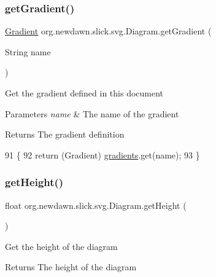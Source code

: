 \subsubsection{\texorpdfstring{get\+Gradient()}{getGradient()}}
{\footnotesize\ttfamily \mbox{\hyperlink{classorg_1_1newdawn_1_1slick_1_1svg_1_1_gradient}{Gradient}} org.\+newdawn.\+slick.\+svg.\+Diagram.\+get\+Gradient (\begin{DoxyParamCaption}\item[{String}]{name }\end{DoxyParamCaption})\hspace{0.3cm}{\ttfamily [inline]}}

Get the gradient defined in this document


\begin{DoxyParams}{Parameters}
{\em name} & The name of the gradient \\
\hline
\end{DoxyParams}
\begin{DoxyReturn}{Returns}
The gradient definition 
\end{DoxyReturn}

\begin{DoxyCode}
91                                              \{
92         \textcolor{keywordflow}{return} (Gradient) \mbox{\hyperlink{classorg_1_1newdawn_1_1slick_1_1svg_1_1_diagram_acdc6103a0bc213559f53001de2c06548}{gradients}}.get(name);
93     \}
\end{DoxyCode}
\mbox{\label{classorg_1_1newdawn_1_1slick_1_1svg_1_1_diagram_ac5e6c5d35ccfdb09d256ae3118210eb8}} 
\subsubsection{\texorpdfstring{get\+Height()}{getHeight()}}
{\footnotesize\ttfamily float org.\+newdawn.\+slick.\+svg.\+Diagram.\+get\+Height (\begin{DoxyParamCaption}{ }\end{DoxyParamCaption})\hspace{0.3cm}{\ttfamily [inline]}}

Get the height of the diagram

\begin{DoxyReturn}{Returns}
The height of the diagram 
\end{DoxyReturn}

